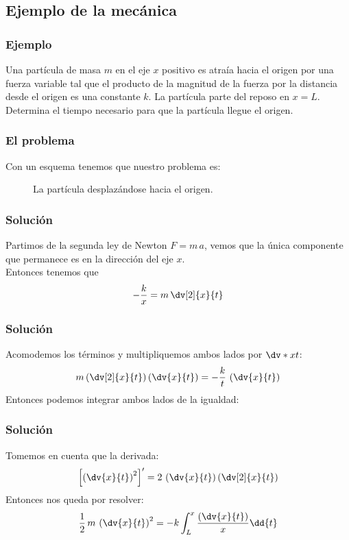 \subsection{Ejemplo de la mecánica}
\begin{frame}
\frametitle{Ejemplo}
Una partícula de masa $m$ en el eje $x$ positivo es atraía hacia el origen por una fuerza variable tal que el producto de la magnitud de la fuerza por la distancia desde el origen es una constante $k$. La partícula parte del reposo en $x = L$.
\\
\bigskip
Determina el tiempo necesario para que la partícula llegue el origen.
\end{frame}
\begin{frame}
\frametitle{El problema}
Con un esquema tenemos que nuestro problema es:
\begin{figure}
    \centering
    
    \caption{La partícula desplazándose hacia el origen.}
\end{figure}
\end{frame}
\begin{frame}
\frametitle{Solución}
Partimos de la segunda ley de Newton $F = m \, a$, vemos que la única componente que permanece es en la dirección del eje $x$.
\\
\bigskip
Entonces tenemos que
\begin{align*}
- \dfrac{k}{x} = m \, \dv[2]{x}{t}
\end{align*}
\end{frame}
\begin{frame}
\frametitle{Solución}
Acomodemos los términos y multipliquemos ambos lados por $\dv*{x}{t}$:
\begin{align*}
m \left( \dv[2]{x}{t} \right) \left( \dv{x}{t} \right) = - \dfrac{k}{t} \,  \left( \dv{x}{t} \right)
\end{align*}
\pause
Entonces podemos integrar ambos lados de la igualdad:
\end{frame}
\begin{frame}
\frametitle{Solución}
Tomemos en cuenta que la derivada:
\begin{align*}
\left[ \left( \dv{x}{t} \right)^{2} \right]^{\prime} = 2 \, \left( \dv{x}{t} \right) \left( \dv[2]{x}{t} \right)
\end{align*}
\pause
Entonces nos queda por resolver:
\begin{align*}
\dfrac{1}{2} \, m \, \left( \dv{x}{t} \right)^{2} = - k \int_{L}^{x} \dfrac{\left( \dv{x}{t} \right)}{x} \dd{t}
\end{align*}
\end{frame}
